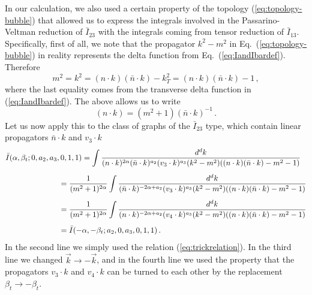 \documentclass[a4paper,11pt]{article}
\newcommand{\nbar}{\ensuremath{\bar{n}}}
\numberwithin{equation}{section}
\begin{document}
In our calculation, we also used a certain property of the topology
(\ref{eq:topology-bubble}) that allowed us to express the integrals involved in
the Passarino-Veltman reduction of $\bar I_{23}$ with the integrals coming from
tensor reduction of $\bar I_{13}$.  
Specifically, first of all, we note that the propagator $k^2-m^2$ in
Eq.~(\ref{eq:topology-bubble}) in reality represents the delta function from
Eq.~(\ref{eq:IandIbardef}). Therefore
%
\begin{equation}
 m^2 = k^2 = (n\cdot k) (\nbar \cdot k) - k_T^2 = 
 (n\cdot k) (\nbar \cdot k) - 1\,,
\end{equation}
%
where the last equality comes from the transverse delta function in
(\ref{eq:IandIbardef}). The above allows us to write
%
\begin{equation}
  (n \cdot k) = (m^2 +1) (\nbar\cdot k)^{-1}\,.
  \label{eq:trickrelation}
\end{equation}
%
Let us now apply this to the class of graphs of the $\bar I_{23}$ type, which
contain linear propagators $\nbar\cdot k$ and $v_3 \cdot k$
%
\begin{align}
  \bar I(\alpha,\beta_t; 0, a_2, a_3, 0, 1, 1)  
  & =
  \int \frac{d^d k}
  {(n\cdot k)^{2\alpha} (\nbar\cdot k)^{a_2} (v_3 \cdot k)^{a_3} 
  (k^2-m^2) ((n\cdot k)(\nbar \cdot k)-m^2-1)}
  \nonumber \\[0.5em]
  & 
  \hspace{-30pt}
  =
  \frac{1}{(m^2+1)^{2\alpha}}
  \int \frac{d^d k}
  {(\nbar\cdot k)^{-2\alpha+a_2} (v_3 \cdot k)^{a_3} 
  (k^2-m^2) ((n\cdot k)(\nbar \cdot k)-m^2-1)}
  \nonumber \\[0.5em]
  &   
  \hspace{-30pt}
  =
  \frac{1}{(m^2+1)^{2\alpha}}
  \int \frac{d^d k}
  {(n\cdot k)^{-2\alpha+a_2} (v_4 \cdot k)^{a_3} 
  (k^2-m^2) ((n\cdot k)(\nbar \cdot k)-m^2-1)}
  \nonumber \\[0.5em]
  &
  \hspace{-30pt}
  =
  \bar I(-\alpha,-\beta_t; a_2, 0, a_3, 0, 1, 1)\,.
\end{align}
%
In the second line we simply used the relation (\ref{eq:trickrelation}). In the
third line we changed $\vec k \to - \vec k$, and in the fourth line we used the
property that the propagators $v_3 \cdot k$ and $v_4 \cdot k$  can be turned to
each other by the replacement $\beta_t \to -\beta_t$.
\end{document}
